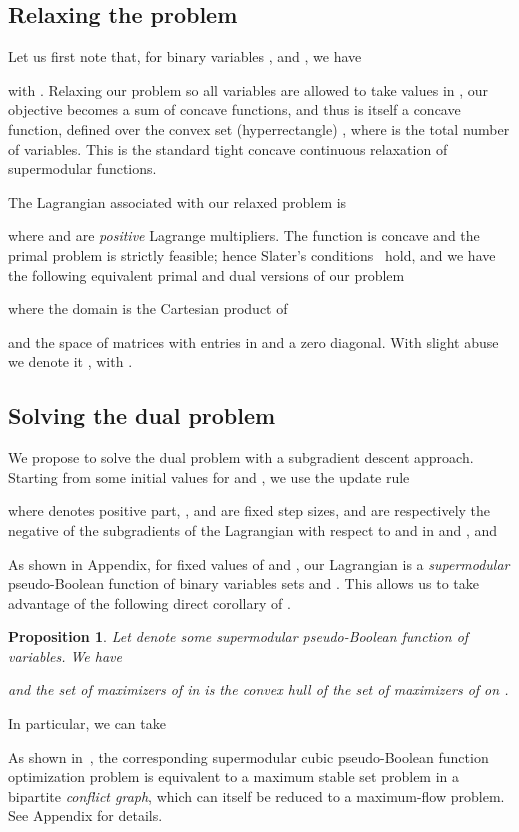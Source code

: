 \documentclass[10pt,twocolumn,letterpaper]{article}
\numberwithin{theorem}{section}
\newtheorem{proposition}[theorem]{Proposition}
\begin{document}
\subsection{Relaxing the problem}
\label{sec:optimization}
Let us first note that, for
binary variables ,  and , we have

with . Relaxing our problem so all variables are
allowed to take values in , our objective becomes a sum of
concave functions, and thus is itself a concave function, defined over
the convex set (hyperrectangle) , where  is the total
number of variables. This is the standard tight
concave continuous relaxation of supermodular functions.

The Lagrangian associated with our relaxed problem is

where  and
 are {\em positive} Lagrange multipliers.
The function  is concave and the primal problem is strictly
feasible; hence Slater's conditions~\cite{Slater50} hold, and we have the following
equivalent primal and dual versions of our problem

where the domain  is the Cartesian product of 
 
and the space of
 matrices with entries in  and a zero diagonal. With slight abuse we denote it , with .

\subsection{Solving the dual problem}
We propose to solve the dual problem with a subgradient descent
approach. Starting from some initial values for  and
, we use the update rule

where  denotes positive part, ,  and  are fixed step sizes, 
 and  are
respectively the negative of the subgradients of the Lagrangian with
respect to  and  in  and , and


As shown in Appendix, for fixed values of  and , 
our Lagrangian is a {\em supermodular} pseudo-Boolean function of 
binary variables sets  and .
This allows us to take
advantage of the following direct corollary of \cite[Prop. 3.7]{Bach13}.
\begin{proposition}
Let  denote some supermodular pseudo-Boolean function of 
variables. We have

and the set of maximizers of  in  is the convex hull of
the set of maximizers of  on .
\end{proposition}
In particular, we can take

As shown in~\cite{BiMi85,BoHa02}, the corresponding
supermodular cubic pseudo-Boolean function optimization problem is
equivalent to a maximum stable set problem in a bipartite {\em
  conflict graph}, which can itself be reduced to a maximum-flow
problem. 
See Appendix for details.
\end{document}
